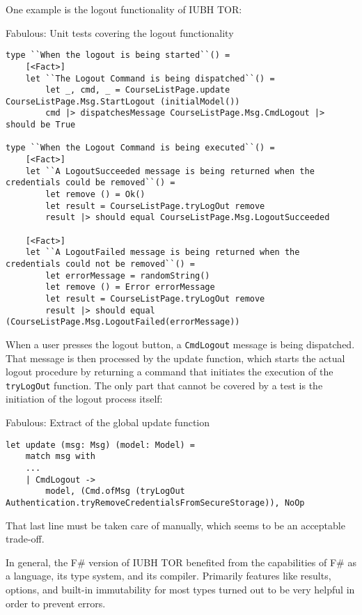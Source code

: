 One example is the logout functionality of IUBH TOR:

\begin{listing}[H]
\caption{Fabulous: Unit tests covering the logout functionality}
\begin{verbatim}
type ``When the logout is being started``() =
    [<Fact>]
    let ``The Logout Command is being dispatched``() =
        let _, cmd, _ = CourseListPage.update CourseListPage.Msg.StartLogout (initialModel())
        cmd |> dispatchesMessage CourseListPage.Msg.CmdLogout |> should be True

type ``When the Logout Command is being executed``() =
    [<Fact>]
    let ``A LogoutSucceeded message is being returned when the credentials could be removed``() =
        let remove () = Ok()
        let result = CourseListPage.tryLogOut remove
        result |> should equal CourseListPage.Msg.LogoutSucceeded
        
    [<Fact>]
    let ``A LogoutFailed message is being returned when the credentials could not be removed``() =
        let errorMessage = randomString()
        let remove () = Error errorMessage
        let result = CourseListPage.tryLogOut remove
        result |> should equal (CourseListPage.Msg.LogoutFailed(errorMessage))
\end{verbatim}
\end{listing}

When a user presses the logout button, a \texttt{CmdLogout} message is being dispatched. That message is then processed by the update function, which starts the actual logout procedure by returning a command that initiates the execution of the \texttt{tryLogOut} function. The only part that cannot be covered by a test is the initiation of the logout process itself:

\begin{listing}[H]
\caption{Fabulous: Extract of the global update function}
\begin{verbatim}
let update (msg: Msg) (model: Model) =
    match msg with
    ...
    | CmdLogout ->
        model, (Cmd.ofMsg (tryLogOut Authentication.tryRemoveCredentialsFromSecureStorage)), NoOp
\end{verbatim}
\end{listing}

That last line must be taken care of manually, which seems to be an acceptable trade-off. 

In general, the F\# version of IUBH TOR benefited from the capabilities of F\# as a language, its type system, and its compiler. Primarily features like results, options, and built-in immutability for most types turned out to be very helpful in order to prevent errors.

